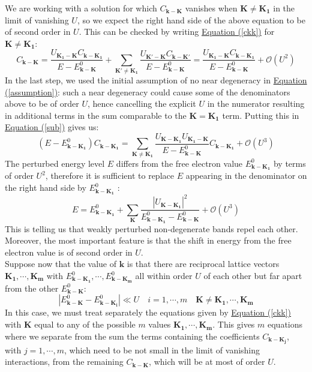 \documentclass[10.75pt,a4paper,openright,bottom=2cm]{article}
\renewcommand{\Vec}[1]{\boldsymbol{#1}}
\renewcommand{\refeq}[1]{\hyperref[#1]{Equation (\ref{#1})}}
\begin{document}
We are working with a solution for which $C_{\Vec{k}-\Vec{K}}$ vanishes when $\Vec{K}\neq\Vec{K_1}$ in the limit of vanishing $U$, so we expect the right hand side of the above equation to be of second order in $U$. This can be checked by writing \hyperref[ckk]{Equation (\ref{ckk})} for $\Vec{K}\neq\Vec{K_1}$:
\[
C_{\Vec{k}-\Vec{K}}=\frac{U_{\Vec{K_1}-\Vec{K}}C_{\Vec{k}-\Vec{K_1}}}{E-E^0_{\Vec{k}-\Vec{K}}}+\sum_{\Vec{K'}\neq\Vec{K_1}}\frac{U_{\Vec{K'}-\Vec{K}}C_{\Vec{k}-\Vec{K'}}}{E-E^0_{\Vec{k}-\Vec{K}}}=\frac{U_{\Vec{K_1}-\Vec{K}}C_{\Vec{k}-\Vec{K_1}}}{E-E^0_{\Vec{k}-\Vec{K}}}+\mathcal{O}(U^2)
\]
In the last step, we used the initial assumption of no near degeneracy in \hyperref[assumption]{Equation (\ref{assumption})}: such a near degeneracy could cause some of the denominators above to be of order $U$, hence cancelling the explicit $U$ in the numerator resulting in additional terms in the sum comparable to the $\Vec{K}=\Vec{K_1}$ term. Putting this in \refeq{sub} gives us:
\begin{equation}
\label{nodeg}
(E-E^0_{\Vec{k}-\Vec{K_1}})C_{\Vec{k}-\Vec{K_1}}=\sum_{\Vec{K}\neq\Vec{K_1}}\frac{U_{\Vec{K}-\Vec{K_1}}U_{\Vec{K_1}-\Vec{K}}}{E-E^0_{\Vec{k}-\Vec{K}}}C_{\Vec{k}-\Vec{K_1}}+\mathcal{O}(U^3)
\end{equation}
The perturbed energy level $E$ differs from the free electron value $E^0_{\Vec{k}-\Vec{K_1}}$ by terms of order $U^2$, therefore it is sufficient to replace $E$ appearing in the denominator on the right hand side by $E^0_{\Vec{k}-\Vec{K_1}}$ :
\[
E=E^0_{\Vec{k}-\Vec{K_1}}+\sum_{\Vec{K}}\frac{|U_{\Vec{K}-\Vec{K_1}}|^2}{E^0_{\Vec{k}-\Vec{K_1}}-E^0_{\Vec{k}-\Vec{K}}}+\mathcal{O}(U^3)
\]
This is telling us that weakly perturbed non-degenerate bands repel each other. Moreover, the most important feature is that the shift in energy from the free electron value is of second order in $U$.\\
Suppose now that the value of $\Vec{k}$ is that there are reciprocal lattice vectors $\Vec{K_1},\cdots, \Vec{K_m}$ with $E^0_{\Vec{k}-\Vec{K_1}},\cdots,E^0_{\Vec{k}-\Vec{K_m}}$ all within order $U$ of each other but far apart from the other $E^0_{\Vec{k}-\Vec{K}}$:
\[
|E^0_{\Vec{k}-\Vec{K}}-E^0_{\Vec{k}-\Vec{K_i}}|\ll U \quad i=1,\cdots,m \quad \Vec{K}\neq\Vec{K_1},\cdots,\Vec{K_m}
\]
In this case, we must treat separately the equations given by \refeq{ckk} with $\Vec{K}$ equal to any of the possible $m$ values $\Vec{K_1},\cdots,\Vec{K_m}$. This gives $m$ equations where we separate from the sum the terms containing the coefficients $C_{\Vec{k}-\Vec{K_j}}$, with $j=1,\cdots,m$, which need to be not small in the limit of vanishing interactions, from the remaining $C_{\Vec{k}-\Vec{K}}$, which will be at most of order $U$.
\end{document}

